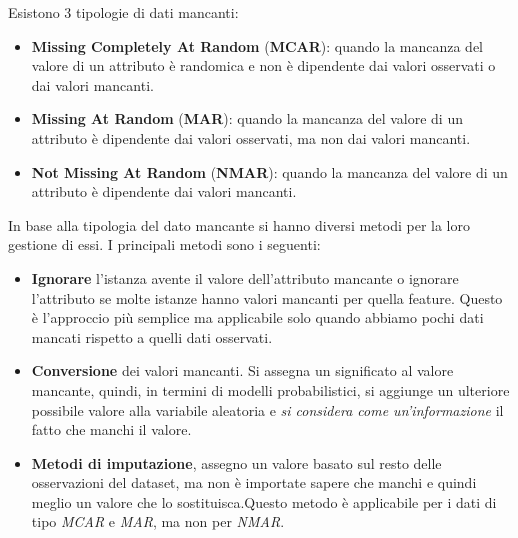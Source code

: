 Esistono 3 tipologie di dati mancanti:
\begin{itemize}
      \item \textbf{Missing Completely At Random} (\textbf{MCAR}): quando la
            mancanza del valore di un attributo è randomica e non è dipendente dai valori
            osservati o dai valori mancanti.
      \item \textbf{Missing At Random} (\textbf{MAR}): quando la mancanza del
            valore di un attributo è dipendente dai valori osservati, ma non dai
            valori mancanti.
      \item \textbf{Not Missing At Random} (\textbf{NMAR}): quando la mancanza del
            valore di un attributo è dipendente dai valori mancanti.
\end{itemize}
In base alla tipologia del dato mancante si hanno diversi metodi per la loro
gestione di essi. I principali metodi sono i seguenti:
\begin{itemize}
      \item \textbf{Ignorare} l'istanza avente il valore dell'attributo mancante o
            ignorare l'attributo se molte istanze hanno valori mancanti per quella
            feature. Questo è l'approccio più semplice ma applicabile solo quando
            abbiamo pochi dati mancati rispetto a quelli dati osservati.
      \item \textbf{Conversione} dei valori mancanti. Si assegna un significato al
            valore mancante, quindi, in termini di modelli probabilistici, si
            aggiunge un ulteriore possibile valore alla variabile aleatoria e
            \textit{si considera come un'informazione} il fatto che manchi il valore.
      \item \textbf{Metodi di imputazione}, assegno un valore basato sul resto delle
            osservazioni del dataset, ma non è importate sapere che manchi e quindi
            meglio un valore che lo sostituisca.Questo metodo è applicabile per i
            dati di tipo \textit{MCAR} e \textit{MAR}, ma non per \textit{NMAR}.
\end{itemize}
